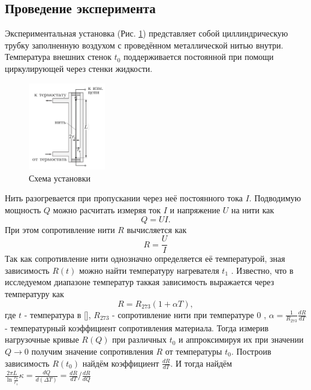\documentclass[12pt]{article}
\begin{document}
\subsection{Проведение эксперимента}
Экспериментальная установка (Рис. \ref{fig:2}) представляет собой 
циллиндрическую трубку заполненную воздухом с проведённом металлической нитью внутри.
Температура внешних стенок $t_0$ 
поддерживается постоянной при помощи циркулирующей через стенки жидкости.
\begin{figure}[H]
    \centering
    \includegraphics[width=0.3\textwidth]{2.png}
    \caption{Схема установки}
    \label{fig:2}
\end{figure} 
Нить разогревается при пропускании через неё постоянного тока $I$.
Подводимую мощность $Q$  можно расчитать измеряя ток $I$ и напряжение $U$ на нити как
\begin{equation}
    Q = UI.
    \label{eq:6}
\end{equation}
При этом сопротивление нити $R$ вычисляется как
\begin{equation}
    R = \frac{U}{I}
    \label{eq:7}
\end{equation}  
Так как сопротивление нити однозначно определяется её температурой, зная зависимость $R(t)$ можно найти температуру нагревателя $t_1$ . 
Известно, что в исследуемом диапазоне температур таккая зависимость выражается через температуру как
\begin{equation}
    R = R_{273} (1 + \alpha T), 
    \label{eq:RT}
\end{equation}
где $t$ - температура в [\textcelsius], $R_{273}$ - сопротивление нити при температуре $0$ \textcelsius, 
$\alpha = \frac{1}{R_{273}}\frac{dR}{dT}$ - температурный коэффициент сопротивления материала. 
Тогда измерив нагрузочные кривые $R(Q)$ при различных $t_0$ и аппроксимируя их при значении $Q \to 0$ получим 
значение сопротивления $R$ от температуры $t_0$. Построив зависимость $R(t_0)$ найдём коэффициент $\frac{dR}{dT}$. И тогда 
найдём $\frac{2\pi L}{\ln \frac{r_0}{r_1}} \kappa = \frac{d Q}{d (\Delta T)} = \frac{d R}{d T} / \frac{d R}{d Q}$      
\end{document}
